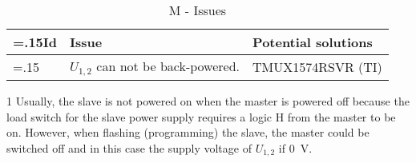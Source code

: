 \begin{table}[H]
    \centering
    \begin{threeparttable}[b]
        \begin{tabularx}{\linewidth}{ >{\hsize=.15\hsize}X >{\hsize=1.35\hsize}X >{\hsize=1.5\hsize}X }
            Id & Issue                                       & Potential solutions \\
            \midrule
            1  & $U_{1,2}$ can not be back-powered.\tnote{1} & TMUX1574RSVR (TI)   \\
        \end{tabularx}
        \begin{tablenotes}
            \item [1]   Usually, the slave is not powered on when the master is powered off because
            the load switch for the slave power supply requires a logic H from the master to be on.
            However, when flashing (programming) the slave, the master could be switched off and in this
            case the supply voltage of $U_{1,2}$ if \SI{0}{\volt}.
        \end{tablenotes}
    \end{threeparttable}
    \caption{\mu M - Issues}

\end{table}